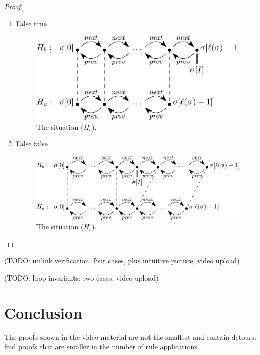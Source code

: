 \documentclass[runningheads]{llncs}
\begin{document}
\begin{proof}
\begin{enumerate}
    \item False true

\begin{figure}
   \centering
   \includegraphics[scale=0.2]{figures/linkedlist-unlink-last.eps}
   \caption{The situation ($H_b$).}
   \vspace*{-12pt}
   \label{fig:unlink-last}
\end{figure}

    \item False false
    
\begin{figure}
   \centering
   \includegraphics[scale=0.2]{figures/linkedlist-unlink-middle.eps}
   \caption{The situation ($H_b$).}
   \vspace*{-12pt}
   \label{fig:unlink-middle}
\end{figure}
    
\end{enumerate}
\end{proof}

(TODO: unlink verification: four cases, plus intuitive picture, video upload)

(TODO: loop invariants: two cases, video upload)

\section{Conclusion}\label{sec:conclusion}

\begin{exercise}
The proofs shown in the video material are not the smallest and contain detours: find proofs that are smaller in the number of rule applications.
\end{exercise}
\end{document}

